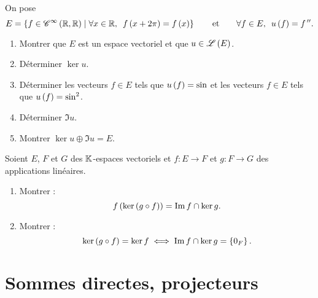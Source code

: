 \begin{corr}
\end{corr}

\begin{exo}
On pose \[E=\accol{f\in\ensclasse{\infty}{\R}{\R}\tq\quantifs{\forall x\in\R}f\paren{x+2\pi}=f\paren{x}}\qquad\text{et}\qquad\quantifs{\forall f\in E}u\paren{f}=f\seconde.\]

\begin{enumerate}
\item Montrer que \(E\) est un espace vectoriel et que \(u\in\mathscr{L}\left(E\right)\). \\

\item Déterminer \(\ker u\). \\

\item Déterminer les vecteurs \(f\in E\) tels que \(u\left(f\right)=\sin\) et les vecteurs \(f\in E\) tels que \(u\left(f\right)=\sin^2\). \\

\item Déterminer \(\Im u\). \\

\item Montrer \(\ker u\oplus\Im u=E\).
\end{enumerate}
\end{exo}

\begin{corr}
\end{corr}

\begin{exo}
Soient \(E\), \(F\) et \(G\) des \(\mathbb{K}\)-espaces vectoriels et \(f:E\to F\) et \(g:F\to G\) des applications linéaires.

\begin{enumerate}
\item Montrer : \[f\left(\ker\left(g\circ f\right)\right)=\operatorname{Im} f\cap\ker g.\]

\item Montrer : \[\ker\left(g\circ f\right)=\ker f\iff\operatorname{Im} f\cap\ker g=\left\lbrace0_F\right\rbrace.\]
\end{enumerate}
\end{exo}

\begin{corr}
\end{corr}

\section{Sommes directes, projecteurs}

